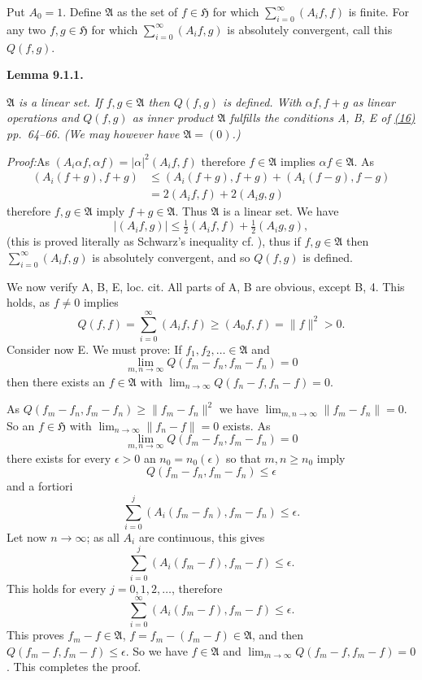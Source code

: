 \documentclass[12pt,b5paper,twoside]{article}
\newcommand{\Hspace}{\mathfrak H}
\newcommand{\Lemma}[1]{%
  \par\smallskip\noindent\phantomsection\label{lem:#1}\textbf{Lemma #1.}\enspace
}
\newcommand{\Proof}{\par\noindent\textit{Proof:}\enspace}
\begin{document}
Put $A_0=1$. Define $\mathfrak A$ as the set of $f\in\Hspace$ for which
$\sum_{i=0}^{\infty}(A_if,f)$ is finite. For any two $f,g\in\Hspace$ for
which $\sum_{i=0}^{\infty}(A_if,g)$ is absolutely convergent, call this
$Q(f,g)$.

\Lemma{9.1.1}
{\itshape
$\mathfrak A$ is a linear set. If $f,g\in\mathfrak A$ then $Q(f,g)$ is
defined. With $\alpha f,f+g$ as linear operations and $Q(f,g)$ as inner
product $\mathfrak A$ fulfills the conditions A, B, E of
\hyperlink{cite.ref16}{(16)} pp.~64--66. (We may however have
$\mathfrak A=(0)$.)}

\Proof As $(A_i\alpha f,\alpha f)=|\alpha|^2(A_if,f)$ therefore
$f\in\mathfrak A$ implies $\alpha f\in\mathfrak A$. As
\begin{align*}
 (A_i(f+g),f+g)
 &\leq(A_i(f+g),f+g)+(A_i(f-g),f-g)\\
 &=2(A_if,f)+2(A_ig,g)
\end{align*}
therefore $f,g\in\mathfrak A$ imply $f+g\in\mathfrak A$. Thus
$\mathfrak A$ is a linear set. We have
\[
 |(A_if,g)|\leq\tfrac12(A_if,f)+\tfrac12(A_ig,g),
\]
(this is proved literally as Schwarz's inequality cf. \cite[p.~64]{ref16}),
thus if $f,g\in\mathfrak A$ then $\sum_{i=0}^{\infty}(A_if,g)$ is absolutely
convergent, and so $Q(f,g)$ is defined.

We now verify A, B, E, loc. cit. All parts of A, B are obvious, except B, 4.
This holds, as $f\ne0$ implies
\[
 Q(f,f)=\sum_{i=0}^{\infty}(A_if,f)\geq(A_0f,f)=\lVert f\rVert^2>0.
\]
Consider now E. We must prove: If $f_1,f_2,\ldots\in\mathfrak A$ and
\[
 \lim_{m,n\to\infty}Q(f_m-f_n,f_m-f_n)=0
\]
then there exists an $f\in\mathfrak A$ with
$\lim_{n\to\infty}Q(f_n-f,f_n-f)=0$.

As
$Q(f_m-f_n,f_m-f_n)\geq\lVert f_m-f_n\rVert^2$ we have
$\lim_{m,n\to\infty}\lVert f_m-f_n\rVert=0$. So an $f\in\Hspace$ with
$\lim_{n\to\infty}\lVert f_n-f\rVert=0$ exists. As
\[
 \lim_{m,n\to\infty}Q(f_m-f_n,f_m-f_n)=0
\]
there exists for every $\epsilon>0$ an $n_0=n_0(\epsilon)$ so that
$m,n\geq n_0$ imply
\[
 Q(f_m-f_n,f_m-f_n)\leq\epsilon
\]
and a fortiori
\[
 \sum_{i=0}^{j}(A_i(f_m-f_n),f_m-f_n)\leq\epsilon.
\]
Let now $n\to\infty$; as all $A_i$ are continuous, this gives
\[
 \sum_{i=0}^{j}(A_i(f_m-f),f_m-f)\leq\epsilon.
\]
This holds for every $j=0,1,2,\ldots$, therefore
\[
 \sum_{i=0}^{\infty}(A_i(f_m-f),f_m-f)\leq\epsilon.
\]
This proves $f_m-f\in\mathfrak A$,
$f=f_m-(f_m-f)\in\mathfrak A$, and then
$Q(f_m-f,f_m-f)\leq\epsilon$. So we have $f\in\mathfrak A$ and
$\lim_{m\to\infty}Q(f_m-f,f_m-f)=0$. This completes the proof.
\end{document}
